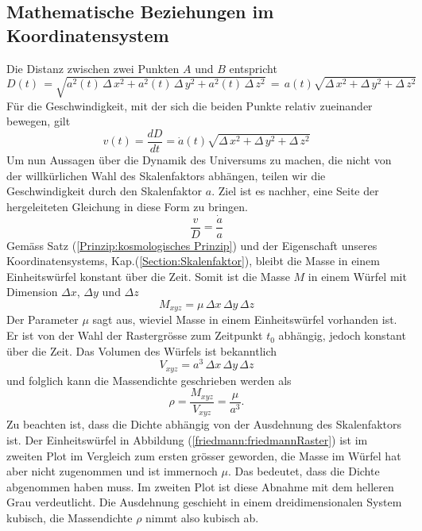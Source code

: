 \begin{refsection}
\subsection{Mathematische Beziehungen im Koordinatensystem \label{friedmann:Beziehungen im Koordinatensystem}}
Die Distanz zwischen zwei Punkten $A$ und $B$ entspricht 
\begin{equation}
D(t)\, = \sqrt{a^2(t)\,\Delta\,x^2 + a^2(t)\,\Delta\,y^2 + a^2(t)\,\Delta\,z^2}\, =\, a(t) \sqrt{\Delta\,x^2 + \Delta\,y^2 + \Delta\,z^2}
\label{friedmann:Abstand}
\end{equation}
F\"{u}r die Geschwindigkeit, mit der sich die beiden Punkte relativ zueinander bewegen, gilt 
\begin{equation}
v(t) = \dfrac{dD}{dt} 
= \dot{a}(t) \sqrt{\Delta\,x^2 + \Delta\,y^2 + \Delta\,z^2}
\label{friedmann:geschwindigkeit}
\end{equation}
Um nun Aussagen über die Dynamik des Universums zu machen, die nicht von der willkürlichen Wahl des Skalenfaktors abhängen, teilen wir die Geschwindigkeit durch den Skalenfaktor $a$. Ziel ist es nachher, eine Seite der hergeleiteten Gleichung in diese Form zu bringen.
\begin{equation}
\frac{v}{D} = \frac{\dot{a}}{a}
\end{equation}
Gemäss Satz (\ref{Prinzip:kosmologisches Prinzip}) und der Eigenschaft unseres Koordinatensystems, Kap.(\ref{Section:Skalenfaktor}), bleibt die Masse in einem Einheitswürfel konstant über die Zeit. Somit ist die Masse $M$ in einem Würfel mit Dimension $\Delta x$, $\Delta y$ und $\Delta z$ 
\begin{equation}
M_{xyz} = \mu \,\Delta x \,\Delta y \,\Delta z
\end{equation}
Der Parameter $\mu$ sagt aus, wieviel Masse in einem Einheitswürfel vorhanden ist. Er ist von der Wahl der Rastergrösse zum Zeitpunkt $t_0$ abhängig, jedoch konstant über die Zeit. Das Volumen des Würfels ist bekanntlich
\begin{equation}
V_{xyz} = a^3 \,\Delta x \,\Delta y \,\Delta z
\end{equation}
und folglich kann die Massendichte geschrieben werden als
\begin{equation}
\rho = \frac{M_{xyz}}{V_{xyz}} = \frac{\mu}{a^3}.
\label{friedmann:dichte}
\end{equation}
Zu beachten ist, dass die Dichte abhängig von der Ausdehnung des Skalenfaktors ist. Der Einheitswürfel in Abbildung (\ref{friedmann:friedmannRaster}) ist im zweiten Plot im Vergleich zum ersten grösser geworden, die Masse im Würfel hat aber nicht zugenommen und ist immernoch $\mu$. Das bedeutet, dass die Dichte abgenommen haben muss. Im zweiten Plot ist diese Abnahme mit dem helleren Grau verdeutlicht. Die Ausdehnung geschieht in einem dreidimensionalen System kubisch, die Massendichte $\rho$ nimmt also kubisch ab.


\end{refsection}
